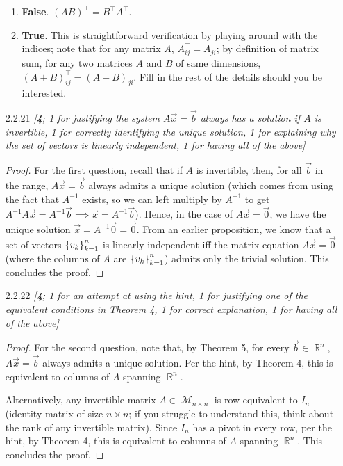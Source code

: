 \documentclass{amsart}
\theoremstyle{definition}
\theoremstyle{definition}
\DeclareMathOperator{\R}{\mathbb{R}}
\DeclareMathOperator{\1}{\mathbbm{1}}
\DeclareMathOperator{\MM}{\mathcal{M}}
\begin{document}
\begin{enumerate}[itemsep = 2mm]
\begin{enumerate}
			\item \textbf{False}. $(AB)^\intercal = B^\intercal A^\intercal$.
			
			\item \textbf{True}. This is straightforward verification by playing around with the indices; note that for any matrix $A$, $A^{\intercal}_{ij} = A_{ji}$; by definition of matrix sum, for any two matrices $A$ and $B$ of same dimensions, $(A+B)^{\intercal}_{ij} = (A+B)_{ji}$. Fill in the rest of the details should you be interested.
		\end{enumerate}
		
		
		\item[2.2.21] \textit{[\textbf{4}; 1 for justifying the system $A\vec{x} = \vec{b}$ always has a solution if $A$ is invertible, 1 for correctly identifying the unique solution, 1 for explaining why the set of vectors is linearly independent, 1 for having all of the above]}
		
		\begin{proof}
		For the first question, recall that if $A$ is invertible, then, for all $\vec{b}$ in the range, $A\vec{x} = \vec{b}$ always admits a unique solution (which comes from using the fact that $A^{-1}$ exists, so we can left multiply by $A^{-1}$ to get $A^{-1} A \vec{x} = A^{-1} \vec{b} \implies \vec{x} = A^{-1} \vec{b}$). Hence, in the case of $A \vec{x} = \vec{0}$, we have the unique solution $\vec{x} = A^{-1} \vec{0} = \vec{0}$. From an earlier proposition, we know that a set of vectors $\set{v_k}_{k=1}^{n}$ is linearly independent iff the matrix equation $A\vec{x} = \vec{0}$ (where the columns of $A$ are $\set{v_k}_{k=1}^{n}$) admits only the trivial solution. This concludes the proof.
		\end{proof}
		
		
		
		\item[2.2.22] \textit{[\textbf{4}; 1 for an attempt at using the hint, 1 for justifying one of the equivalent conditions in Theorem 4, 1 for correct explanation, 1 for having all of the above]}
		
		\begin{proof}
			For the second question, note that, by Theorem 5, for every $\vec{b} \in \R^n$, $A\vec{x} = \vec{b}$ always admits a unique solution. Per the hint, by Theorem 4, this is equivalent to columns of $A$ spanning $\R^n$.
			
			Alternatively, any invertible matrix $A \in \MM_{n \times n}$ is row equivalent to $I_n$ (identity matrix of size $n \times n$; if you struggle to understand this, think about the rank of any invertible matrix). Since $I_n$ has a pivot in every row, per the hint, by Theorem 4, this is equivalent to columns of $A$ spanning $\R^n$. This concludes the proof.
		\end{proof}
		

\end{enumerate}
\end{document}
